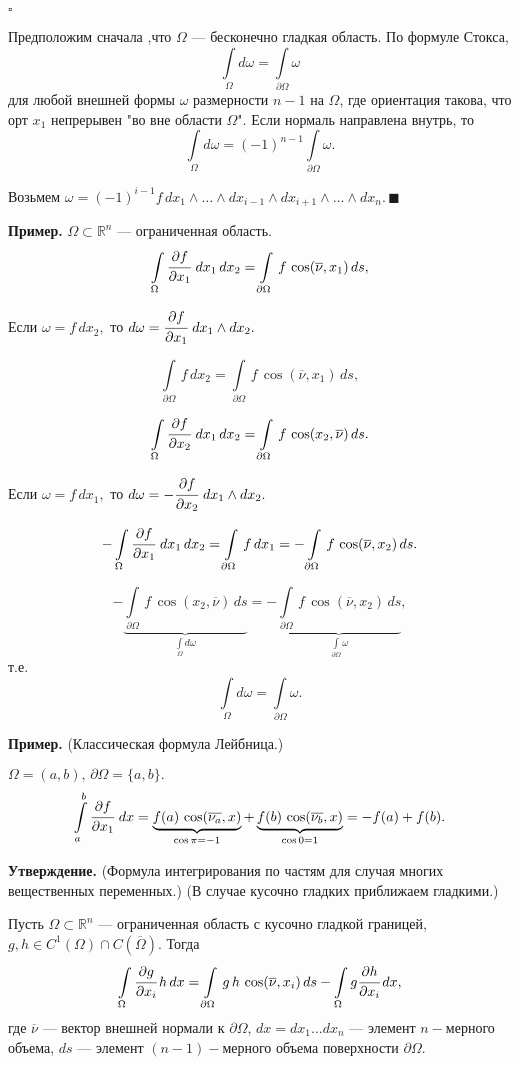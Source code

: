 \documentclass[12pt,a4paper,draft]{article}
\DeclareRobustCommand*{\т}{~--- }
\DeclareRobustCommand*{\ч}{~-- }
\begin{document}
$\square$

Предположим сначала ,что $\Omega$ --- бесконечно гладкая область.
По формуле Стокса,
$$\int\limits_{\Omega}d\omega=\int\limits_{\partial\Omega}\omega$$
для любой внешней формы $\omega$ размерности $n-1$ на $\Omega$,
где ориентация такова, что орт $x_1$ непрерывен "во вне области
$\Omega$". Если нормаль направлена внутрь, то
$$\int\limits_{\Omega}d\omega=(-1)^{n-1}\int\limits_{\partial\Omega}\omega.$$

Возьмем $\omega=(-1)^{i-1}f\,dx_1\wedge\ldots\wedge dx_{i-1}\wedge
dx_{i+1}\wedge\ldots\wedge dx_n.\,\blacksquare$

\textbf{Пример.} $\Omega\subset\mathbb R^n$ --- ограниченная
область.
$$\int\limits_{\Omega}\cfrac{\partial f}{\partial
x_1}\,\,dx_1\,dx_2=\int\limits_{\partial\Omega}\,f\,\cos(\overline{\nu},x_1)\,ds,$$

Если $\omega=f\,dx_2,$ то $d\omega=\cfrac{\partial f}{\partial
x_1}\,\,dx_1\wedge dx_2.$

$$\int\limits_{\partial\Omega}\,f\,dx_2=
\int\limits_{\partial\Omega}\,f\,\cos(\overline{\nu},x_1)\,ds,$$

$$\int\limits_{\Omega}\cfrac{\partial f}{\partial
x_2}\,\,dx_1\,dx_2=
\int\limits_{\partial\Omega}\,f\,\cos(x_2,\overline{\nu})\,ds.$$


Если $\omega=f\,dx_1,$ то $d\omega=-\cfrac{\partial f}{\partial
x_2}\,\,dx_1\wedge dx_2.$

$$-\int\limits_{\Omega}\cfrac{\partial f}{\partial
x_1}\,\,dx_1\,dx_2= \int\limits_{\partial\Omega}\,f\,dx_1=
-\int\limits_{\partial\Omega}\,f\,\cos(\overline{\nu},x_2)\,ds.$$

$$-\underbrace{\int\limits_{\partial\Omega}\,f\,\cos(x_2,\overline{\nu})\,ds}_
{\int\limits_{\Omega}d\omega}=
-\underbrace{\int\limits_{\partial\Omega}\,f\,\cos(\overline{\nu},x_2)\,ds}_
{\int\limits_{\partial\Omega}\omega},$$ т.е.
$$\int\limits_{\Omega}d\omega=\int\limits_{\partial\Omega}\omega.$$

\textbf{Пример.} (Классическая формула Лейбница.)

$\Omega=(a,b),\,\partial\Omega=\{a,b\}.$
$$\int\limits_a^b\cfrac{\partial f}{\partial
x_1}\,\,dx=
\underbrace{f(a)\,\cos(\overline{\nu_a},x)}_{\cos\pi=-1}+
\underbrace{f(b)\,\cos(\overline{\nu_b},x)}_{\cos
0=1}=-f(a)+f(b).$$

\textbf{Утверждение.} (Формула интегрирования по частям для случая
многих вещественных переменных.) (В случае кусочно гладких
приближаем гладкими.)

Пусть $\Omega\subset\mathbb R^n$ --- ограниченная область с
кусочно гладкой границей, $g,h\in C^1(\Omega)\cap
C(\overline{\Omega}).$ Тогда
$$\int\limits_{\Omega}\cfrac{\partial g}{\partial
x_i}\,h\,dx=\int\limits_{\partial\Omega}\,g\,h\,\cos(\overline{\nu},x_i)\,ds-
\int\limits_{\Omega}g\cfrac{\partial h}{\partial x_i}\,dx,$$ где
$\overline{\nu}$ --- вектор внешней нормали к
$\partial\Omega,\,dx=dx_1\ldots dx_n$ --- элемент $n-$мерного
объема, $ds$ --- элемент $(n-1)-$мерного объема поверхности
$\partial\Omega$.
\end{document}
